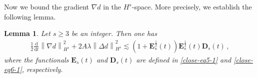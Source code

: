\documentclass[reqno,11pt]{amsart}
\newtheorem{lemma}{Lemma}[section]
\numberwithin{equation}{section}
\def\d{\mathrm{d}}
\begin{document}
Now we bound the gradient $\nabla d$ in the $H^s$-space. More precisely, we establish the following lemma.

\begin{lemma}\label{Lmm-G3}
    Let $s \ge 3$ be an integer. Then one has
\begin{equation}\label{nd4}
\begin{aligned}
\frac{1}{2} \frac{\d}{\d t} \left\| \nabla d \right\|_{H^s}^2 + 2A \lambda \left\| \Delta d \right\|_{H^s}^2 \lesssim ( 1 + \mathbf{E}_s^\frac{1}{2} (t) ) \mathbf{E}_s^\frac{1}{2} (t) \mathbf{D}_s (t) \,,
\end{aligned}
\end{equation}
where the functionals $\mathbf{E}_s (t)$ and $\mathbf{D}_s (t)$ are defined  in \eqref{close-eq5-1} and \eqref{close-eq6-1}, respectively.
\end{lemma}
\end{document}
